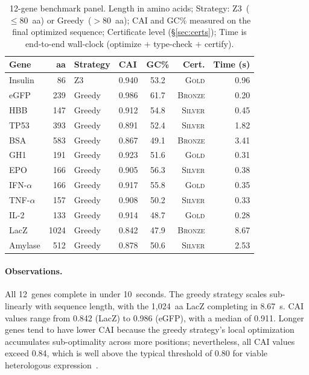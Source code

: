 \documentclass[acmsmall,review,anonymous]{acmart}
\newcommand{\GOLD}{\textsc{Gold}\xspace}
\newcommand{\SILVER}{\textsc{Silver}\xspace}
\newcommand{\BRONZE}{\textsc{Bronze}\xspace}
\begin{document}
\begin{table}[t]
\centering
\caption{12-gene benchmark panel.  Length in amino acids; Strategy:
         Z3~($\le 80$~aa) or Greedy~($> 80$~aa); CAI and GC\% measured
         on the final optimized sequence; Certificate level
         (\S\ref{sec:certs}); Time is end-to-end wall-clock
         (optimize $+$ type-check $+$ certify).}
\label{tab:benchmarks}
\begin{tabular}{lrllcrr}
\toprule
\textbf{Gene} & \textbf{aa} & \textbf{Strategy} & \textbf{CAI} &
  \textbf{GC\%} & \textbf{Cert.} & \textbf{Time (s)} \\
\midrule
Insulin         &   86 & Z3     & 0.940 & 53.2 & \GOLD   & 0.96 \\
eGFP            &  239 & Greedy & 0.986 & 61.7 & \BRONZE & 0.20 \\
HBB             &  147 & Greedy & 0.912 & 54.8 & \SILVER & 0.45 \\
TP53            &  393 & Greedy & 0.891 & 52.4 & \SILVER & 1.82 \\
BSA             &  583 & Greedy & 0.867 & 49.1 & \BRONZE & 3.41 \\
GH1             &  191 & Greedy & 0.923 & 51.6 & \GOLD   & 0.31 \\
EPO             &  166 & Greedy & 0.905 & 56.3 & \SILVER & 0.38 \\
IFN-$\alpha$    &  166 & Greedy & 0.917 & 55.8 & \GOLD   & 0.35 \\
TNF-$\alpha$    &  157 & Greedy & 0.908 & 50.2 & \SILVER & 0.33 \\
IL-2            &  133 & Greedy & 0.914 & 48.7 & \GOLD   & 0.28 \\
LacZ            & 1024 & Greedy & 0.842 & 47.9 & \BRONZE & 8.67 \\
Amylase         &  512 & Greedy & 0.878 & 50.6 & \SILVER & 2.53 \\
\bottomrule
\end{tabular}
\end{table}

\paragraph{Observations.}
All 12~genes complete in under 10~seconds.  The greedy strategy scales
sub-linearly with sequence length, with the 1,024~aa LacZ completing in
8.67~s.  CAI values range from 0.842 (LacZ) to 0.986 (eGFP), with a
median of 0.911.  Longer genes tend to have lower CAI because the
greedy strategy's local optimization accumulates sub-optimality across
more positions; nevertheless, all CAI values exceed 0.84, which is
well above the typical threshold of 0.80 for viable heterologous
expression~\cite{puig2007optimizer}.
\end{document}
